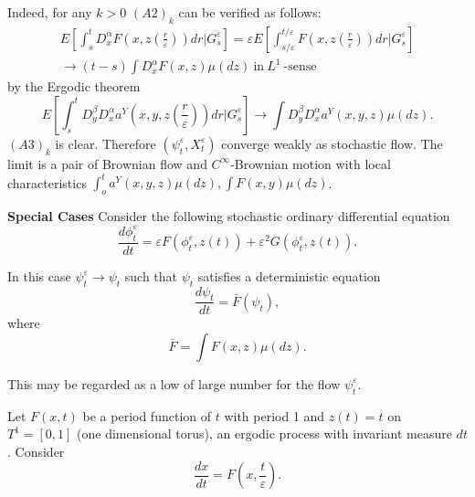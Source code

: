 Indeed, for any $k>0$ $(A 2)_k$ can be verified as follows:
\begin{multline*}
  E\left[ \int ^t_s D^ \alpha _x F\left(x,
    z\left(\frac{r}{\varepsilon}\right)\right)dr |G^ \varepsilon
    _s\right]  = \varepsilon  
  E\left[\int ^{t/ \varepsilon}_{s/ \varepsilon}F\left(x, 
    z\left(\frac{r}{\varepsilon}\right)\right)dr |G^ \varepsilon
    _s\right]\\   
  \to (t-s) \int D^ \alpha _x F(x,z)\mu (dz) ~\text{in}~ L^1 ~\text{-sense}
  \tag{3.9.5}\label{c3:eq3.9.5}
\end{multline*}
by the Ergodic theorem
\begin{equation*}
  E \left[\int ^t_s D^ \beta _y D^\alpha _x
    a^Y\left(x,y,z\left(\frac{r}{\varepsilon}\right)\right)dr |G^ \varepsilon
    _s\right] \to \int D^ \beta _y D^\alpha _x a^Y(x,y,z) \mu
  (dz). \tag{3.9.6}\label{c3:eq3.9.6} 
\end{equation*}
$(A3)_k$ is clear. Therefore $(\psi ^\varepsilon_t,X^\varepsilon_t)$ converge weakly
as stochastic flow. The limit is a pair of Brownian flow and $C^
\infty$-Brownian motion with local characteristics $\int ^t_o a^Y
(x,y,z) \mu (dz), \int F(x,y) \mu (dz)$. 

\medskip
\noindent
{\bf Special Cases} Consider the following stochastic ordinary
differential equation 
\begin{equation*}
  \frac{d \phi^\varepsilon_t}{dt} = \varepsilon F (\phi^\varepsilon_t,
  z(t))+ \varepsilon^2 G 
(\phi^\varepsilon_t,z(t)). \tag{3.9.7}\label{c3:eq3.9.7} 
\end{equation*}

In this case $\psi ^\varepsilon_t \to \psi_t$ such that $\psi_t$ satisfies a
deterministic equation 
\begin{equation*}
  \frac{d \psi _t}{dt} =\bar{F}(\psi_t), \tag{3.9.8}\label{c3:eq3.9.8}
\end{equation*}
where
\begin{equation*}
  \bar{F}= \int F(x,z) \mu (dz). \tag{3.9.9}\label{c3:eq3.9.9}
\end{equation*}

This may be regarded as a low of large number for the flow $\psi ^\varepsilon _t$.

Let $F(x,t)$ be a period function of $t$ with period 1 and $z(t)=t$
on $T^1=[0,1]$ (one dimensional torus), an ergodic process with
invariant measure $dt$. Consider 
\begin{equation*}
  \frac{dx}{dt}= F (x, \frac{t}{\varepsilon}). 
\tag{3.9.10}\label{c3:eq3.9.10}
\end{equation*}\pageoriginale

